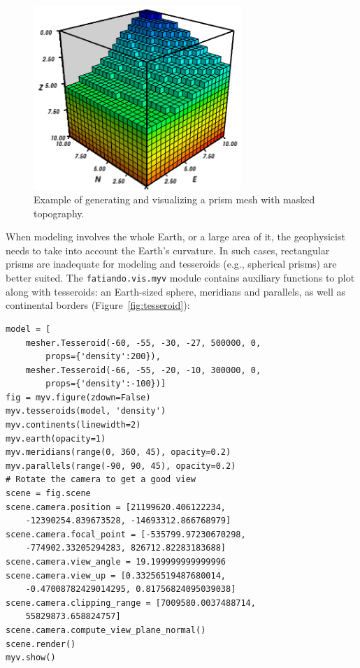 \begin{figure}
    \centering
    \includegraphics[width=0.7\textwidth]{figures/paper1/meshes_3dplotting_meshtopo}
    \caption{
        Example of generating and visualizing a prism mesh with masked
        topography.
    }
    \label{fig:meshtopo}
\end{figure}

When modeling involves the whole Earth, or a large area of it, the
geophysicist needs to take into account the Earth's curvature. In such
cases, rectangular prisms are inadequate for modeling and tesseroids
(e.g., spherical prisms) are better suited. The
\texttt{fatiando.vis.myv} module contains auxiliary functions to plot
along with tesseroids: an Earth-sized sphere, meridians and parallels,
as well as continental borders (Figure~\ref{fig:tesseroid}):

\begin{verbatim}
model = [
    mesher.Tesseroid(-60, -55, -30, -27, 500000, 0,
        props={'density':200}),
    mesher.Tesseroid(-66, -55, -20, -10, 300000, 0,
        props={'density':-100})]
fig = myv.figure(zdown=False)
myv.tesseroids(model, 'density')
myv.continents(linewidth=2)
myv.earth(opacity=1)
myv.meridians(range(0, 360, 45), opacity=0.2)
myv.parallels(range(-90, 90, 45), opacity=0.2)
# Rotate the camera to get a good view
scene = fig.scene
scene.camera.position = [21199620.406122234,
    -12390254.839673528, -14693312.866768979]
scene.camera.focal_point = [-535799.97230670298,
    -774902.33205294283, 826712.82283183688]
scene.camera.view_angle = 19.199999999999996
scene.camera.view_up = [0.33256519487680014,
    -0.47008782429014295, 0.81756824095039038]
scene.camera.clipping_range = [7009580.0037488714,
    55829873.658824757]
scene.camera.compute_view_plane_normal()
scene.render()
myv.show()
\end{verbatim}

